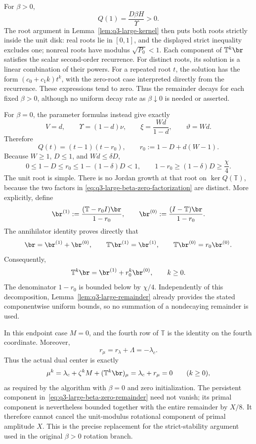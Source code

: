 For \(\beta>0\),
\[
Q(1)=\frac{D\beta H}{\Upsilon}>0.
\]
The root argument in Lemma~\ref{lem:q3-large-kernel} then puts both
roots strictly inside the unit disk: real roots lie in \([0,1]\),
and the displayed strict inequality excludes one; nonreal roots have
modulus \(\sqrt{P_0}<1\).
Each component of \(\mathbb{T}^k\br\) satisfies the scalar
second-order recurrence. For distinct roots, its solution is a linear
combination of their powers. For a repeated root \(t\), the solution
has the form \((c_0+c_1k)t^k\), with the zero-root case interpreted
directly from the recurrence. These expressions tend to zero.
Thus the remainder decays for each fixed \(\beta>0\), although no
uniform decay rate as \(\beta\downarrow0\) is needed or asserted.

For \(\beta=0\), the parameter formulas instead give exactly
\[
V=d,\qquad \Upsilon=(1-d)\nu,
\qquad \xi=\frac{Wd}{1-d},\qquad \vartheta=Wd.
\]
Therefore
\begin{equation}
Q(t)=(t-1)(t-r_0),
\qquad r_0:=1-D+d(W-1).
\label{eq:q3-large-beta-zero-factorization}
\end{equation}
Because \(W\ge1\), \(D\le1\), and \(Wd\le\delta D\),
\[
0\le1-D\le r_0
\le1-(1-\delta)D<1,
\qquad
1-r_0\ge(1-\delta)D\ge\frac{\chi}{4}.
\]
The unit root is simple. There is no Jordan growth at that root on
\(\ker Q(\mathbb{T})\), because the two factors in
\eqref{eq:q3-large-beta-zero-factorization} are distinct.
More explicitly, define
\[
\br^{(1)}:=\frac{(\mathbb{T}-r_0I)\br}{1-r_0},
\qquad
\br^{(0)}:=\frac{(I-\mathbb{T})\br}{1-r_0}.
\]
The annihilator identity proves directly that
\[
\br=\br^{(1)}+\br^{(0)},\qquad
\mathbb{T}\br^{(1)}=\br^{(1)},\qquad
\mathbb{T}\br^{(0)}=r_0\br^{(0)}.
\]
Consequently,
\begin{equation}
\mathbb{T}^k\br=\br^{(1)}+r_0^k\br^{(0)},\qquad k\ge0.
\label{eq:q3-large-beta-zero-remainder}
\end{equation}
The denominator \(1-r_0\) is bounded below by \(\chi/4\).
Independently of this decomposition, Lemma~\ref{lem:q3-large-remainder}
already provides the stated componentwise uniform bounds, so no
summation of a nondecaying remainder is used.

In this endpoint case \(M=0\), and the fourth row of \(\mathbb{T}\)
is the identity on the fourth coordinate. Moreover,
\[
r_\mu=r_\lambda+\Lambda=-\lambda_c.
\]
Thus the actual dual center is exactly
\[
\mu^k=\lambda_c+\zeta^kM+(\mathbb{T}^k\br)_\mu
=\lambda_c+r_\mu=0\qquad(k\ge0),
\]
as required by the algorithm with \(\beta=0\) and zero initialization.
The persistent component in~\eqref{eq:q3-large-beta-zero-remainder}
need not vanish; its primal component is nevertheless bounded together
with the entire remainder by \(X/8\). It therefore cannot cancel the
unit-modulus rotational component of primal amplitude \(X\).
This is the precise replacement for the strict-stability argument used
in the original \(\beta>0\) rotation branch.
